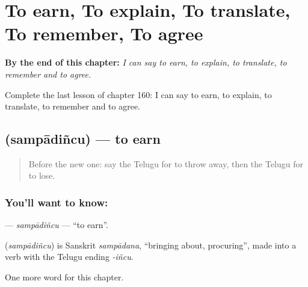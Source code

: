 
\chapter{To earn, To explain, To translate, To remember, To agree}
\label{ch:te-to-earn-to-explain-to-translate-to-remember-to-agree}

\begin{chapteropening}
\textbf{By the end of this chapter:} \emph{I can say to earn, to explain, to translate, to remember and to agree.}

Complete the last lesson of chapter 160: I can say to earn, to explain, to translate, to remember and to agree.
\end{chapteropening}

\section[\texorpdfstring{\te{సంపాదించు} (sampādiñcu)}{సంపాదించు (sampādiñcu)}]{ (sampādiñcu) — to earn}

\label{lesson:TE-C160-sampadincu}



\begin{quote}
Before the new one: say the Telugu for to throw away, then the Telugu for to lose.
\end{quote}

\subsection*{You'll want to know: }
\textbf{} — \emph{sampādiñcu} — \textquotedblleft{}to earn\textquotedblright{}.

\begin{cousinweb}
\textbf{} (\emph{sampādiñcu}) is Sanskrit \emph{sampādana}, \textquotedblleft{}bringing about, procuring\textquotedblright{}, made into a verb with the Telugu ending \emph{-iñcu}.
\end{cousinweb}

\begin{grammarlens}[title={What you've built}]
One more word for this chapter.
\end{grammarlens}

